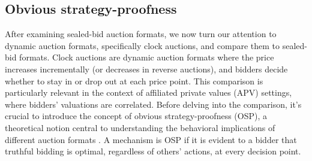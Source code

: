 \documentclass{article} %
\begin{document}




\subsection{Obvious strategy-proofness}\label{session:OSP}

After examining sealed-bid auction formats, we now turn our attention to dynamic auction formats, specifically clock auctions, and compare them to sealed-bid formats. Clock auctions are dynamic auction formats where the price increases incrementally (or decreases in reverse auctions), and bidders decide whether to stay in or drop out at each price point.
This comparison is particularly relevant in the context of affiliated private values (APV) settings, where bidders' valuations are correlated.
Before delving into the comparison, it's crucial to introduce the concept of obvious strategy-proofness (OSP), a theoretical notion central to understanding the behavioral implications of different auction formats \cite{li2017obviously}. 
A mechanism is OSP if it is evident to a bidder that truthful bidding is optimal, regardless of others' actions, at every decision point.
\end{document}
